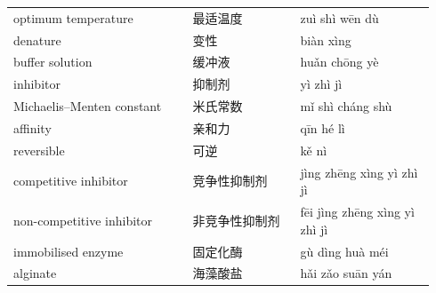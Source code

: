 \documentclass[11pt]{article}
\begin{document}
\begin{longtable}{@{}p{0.40\linewidth}p{0.24\linewidth}p{0.30\linewidth}@{}}
optimum temperature & 最适温度 & zuì shì wēn dù \\
denature & 变性 & biàn xìng \\
buffer solution & 缓冲液 & huǎn chōng yè \\
inhibitor & 抑制剂 & yì zhì jì \\
Michaelis–Menten constant & 米氏常数 & mǐ shì cháng shù \\
affinity & 亲和力 & qīn hé lì \\
reversible & 可逆 & kě nì \\
competitive inhibitor & 竞争性抑制剂 & jìng zhēng xìng yì zhì jì \\
non-competitive inhibitor & 非竞争性抑制剂 & fēi jìng zhēng xìng yì zhì jì \\
immobilised enzyme & 固定化酶 & gù dìng huà méi \\
alginate & 海藻酸盐 & hǎi zǎo suān yán \\
\end{longtable}
\end{document}
